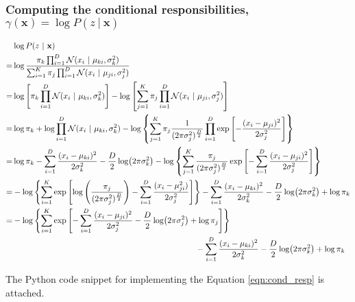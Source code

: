 \documentclass[a4paper,12pt]{article}
\newcommand{\given}{\ | \ }
\newcommand{\x}{\mathbf{x}}
\begin{document}
\clearpage
\subsubsection{Computing the conditional responsibilities, $\gamma(\mathbf{x}) = \log P(z \ | \ \mathbf{x})$}

\begin{align}
\label{eqn:cond_resp}
\begin{split}
& \log P(z \given \x) \\
= & \log \frac{\pi_k \prod_{i=1}^D \mathcal{N}(x_i \given \mu_{ki}, \sigma_k^2)}{\sum_{i=1}^K \pi_j \prod_{i=1}^D \mathcal{N}(x_i \given \mu_{ji}, \sigma_j^2)} \\
= & \log \left[ \pi_k \prod_{i=1}^D \mathcal{N} (x_i \given \mu_{ki}, \sigma_k^2 ) \right] - \log \left[ \sum_{j=1}^K \pi_j \prod_{i=1}^D \mathcal{N} (x_i \given \mu_{ji}, \sigma_j^2) \right] \\
= & \log \pi_k + \log \prod_{i=1}^D \mathcal{N} (x_i \given \mu_{ki}, \sigma_k^2) - \log \left \{ \sum_{j=1}^K \pi_j \frac{1}{(2 \pi \sigma_j^2)^{\frac{D}{2}}} \prod_{i=1}^D \exp\left[-\frac{(x_i - \mu_{ji})^2}{2 \sigma_j^2}\right] \right \} \\
= & \log \pi_k - \sum_{i=1}^D \frac{(x_i - \mu_{ki})^2}{2 \sigma_k^2} - \frac{D}{2} \log(2 \pi \sigma_k^2) - \log \left \{ \sum_{j=1}^K \frac{\pi_j}{(2 \pi \sigma_j^2)^{\frac{D}{2}}} \exp \left[ - \sum_{i=1}^D \frac{(x_i - \mu_{ji})^2}{2 \sigma_j^2} \right]  \right \} \\
= & -\log \left \{\sum_{i=1}^K \exp \left[ \log \left( \frac{\pi_j}{(2 \pi \sigma_j^2)^{\frac{D}{2}}} \right) - \sum_{i=1}^D \frac{(x_i - \mu_{ji}^2)}{2 \sigma_j^2} \right] \right \} - \sum_{i=1}^D \frac{(x_i - \mu_{ki})^2}{2 \sigma_k^2} - \frac{D}{2} \log(2 \pi \sigma_k^2) + \log \pi_k \\
= & -\log \left \{ \sum_{i=1}^K \exp \left[ - \sum_{i=1}^D \frac{(x_i - \mu_{ji})^2}{2 \sigma_j^2} - \frac{D}{2} \log(2 \pi \sigma_j^2) + \log \pi_j \right] \right \} \\
& \hspace{22.5em} - \sum_{i=1}^D \frac{(x_i - \mu_{ki})^2}{2 \sigma_k^2} - \frac{D}{2} \log(2 \pi \sigma_k^2) + \log \pi_k
\end{split}
\end{align}

The Python code snippet for implementing the Equation \ref{eqn:cond_resp} is attached.
\end{document}
